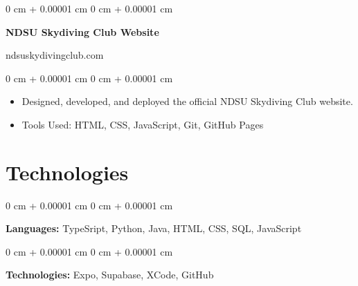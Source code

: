\documentclass[10pt, letterpaper]{article}
\newenvironment{highlights}{
    \begin{itemize}[
        topsep=0.10 cm,
        parsep=0.10 cm,
        partopsep=0pt,
        itemsep=0pt,
        leftmargin=0 cm + 20pt
    ]
}{
    \end{itemize}
} %
\newenvironment{onecolentry}{
    \begin{adjustwidth}{
        0 cm + 0.00001 cm
    }{
        0 cm + 0.00001 cm
    }
}{
    \end{adjustwidth}
} %
\newenvironment{twocolentry}[2][]{
    \onecolentry
    \def\secondColumn{#2}
    \setcolumnwidth{\fill, 4.5 cm}
    \begin{paracol}{2}
}{
    \switchcolumn \raggedleft \secondColumn
    \end{paracol}
    \endonecolentry
} %
\begin{document}
    \vspace{0.2 cm}

    \begin{twocolentry}{
        ndsuskydivingclub.com
    }
        \textbf{NDSU Skydiving Club Website}
    \end{twocolentry}

    \vspace{0.10 cm}
    \begin{onecolentry}
        \begin{highlights}
            \item Designed, developed, and deployed the official NDSU Skydiving Club website.
            \item Tools Used: HTML, CSS, JavaScript, Git, GitHub Pages
        \end{highlights}
    \end{onecolentry}

    \section{Technologies}

    \begin{onecolentry}
        \textbf{Languages:} TypeSript, Python, Java, HTML, CSS, SQL, JavaScript
    \end{onecolentry}

    \vspace{0.2 cm}

    \begin{onecolentry}
        \textbf{Technologies:} Expo, Supabase, XCode, GitHub
    \end{onecolentry}
\end{document}
